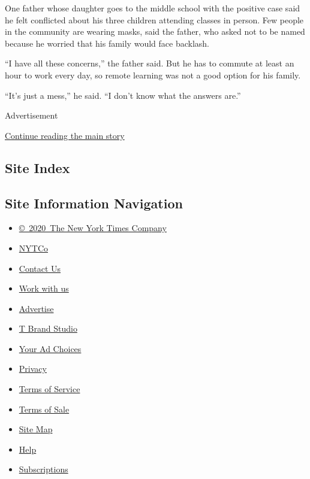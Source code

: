 One father whose daughter goes to the middle school with the positive
case said he felt conflicted about his three children attending classes
in person. Few people in the community are wearing masks, said the
father, who asked not to be named because he worried that his family
would face backlash.

``I have all these concerns,'' the father said. But he has to commute at
least an hour to work every day, so remote learning was not a good
option for his family.

``It's just a mess,'' he said. ``I don't know what the answers are.''

Advertisement

\protect\hyperlink{after-bottom}{Continue reading the main story}

\hypertarget{site-index}{%
\subsection{Site Index}\label{site-index}}

\hypertarget{site-information-navigation}{%
\subsection{Site Information
Navigation}\label{site-information-navigation}}

\begin{itemize}
\tightlist
\item
  \href{https://help.nytimes.com/hc/en-us/articles/115014792127-Copyright-notice}{©~2020~The
  New York Times Company}
\end{itemize}

\begin{itemize}
\tightlist
\item
  \href{https://www.nytco.com/}{NYTCo}
\item
  \href{https://help.nytimes.com/hc/en-us/articles/115015385887-Contact-Us}{Contact
  Us}
\item
  \href{https://www.nytco.com/careers/}{Work with us}
\item
  \href{https://nytmediakit.com/}{Advertise}
\item
  \href{http://www.tbrandstudio.com/}{T Brand Studio}
\item
  \href{https://www.nytimes.com/privacy/cookie-policy\#how-do-i-manage-trackers}{Your
  Ad Choices}
\item
  \href{https://www.nytimes.com/privacy}{Privacy}
\item
  \href{https://help.nytimes.com/hc/en-us/articles/115014893428-Terms-of-service}{Terms
  of Service}
\item
  \href{https://help.nytimes.com/hc/en-us/articles/115014893968-Terms-of-sale}{Terms
  of Sale}
\item
  \href{https://spiderbites.nytimes.com}{Site Map}
\item
  \href{https://help.nytimes.com/hc/en-us}{Help}
\item
  \href{https://www.nytimes.com/subscription?campaignId=37WXW}{Subscriptions}
\end{itemize}
